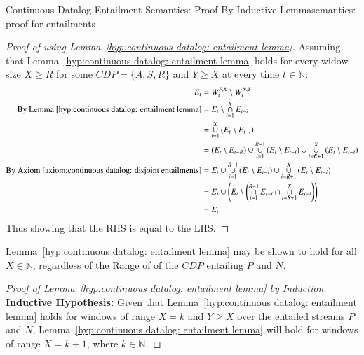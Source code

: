 \begin{nestedsection}{Continuous Datalog Entailment Semantics: Proof By Inductive Lemma}{semantics: proof for entailments}
	\begin{proof}[Proof of  using Lemma~\ref{hyp:continuous datalog: entailment lemma}]
		Assuming that Lemma~\ref{hyp:continuous datalog: entailment lemma} holds for every widow size ${X \geq R}$ for some ${CDP = \{A,S,R\}}$ and ${Y \geq X}$ at every time ${t \in \mathbb{N}}$:
		\begin{align*}
			E_t & = W^{P,X}_t \setminus W^{N,Y}_t \\
			\text{By Lemma~\ref{hyp:continuous datalog: entailment lemma}} & = E_t \setminus \mathop{\cap}^{X}_{i=1} E_{t-i} \\
			& = \mathop{\cup}^{X}_{i=1} \left( E_t \setminus E_{t-i} \right) \\
			& = \left( E_t \setminus E_{t-R} \right) \cup \mathop{\cup}^{R-1}_{i=1} \left( E_t \setminus E_{t-i} \right) \cup \mathop{\cup}^{X}_{i=R+1} \left( E_t \setminus E_{t-i} \right) \\
			\text{By Axiom~\ref{axiom:continuous datalog: disjoint entailments}} & = E_t \cup \mathop{\cup}^{R-1}_{i=1} \left( E_t \setminus E_{t-i} \right) \cup \mathop{\cup}^{X}_{i=R+1} \left( E_t \setminus E_{t-i} \right) \\
			& = E_t \cup \left( E_t \setminus \left( \mathop{\cap}^{R-1}_{i=1} E_{t-i} \cap \mathop{\cap}^{X}_{i=R+1} E_{t-i} \right) \right) \\
			& = E_t
		\end{align*}
		Thus showing that the RHS is equal to the LHS.
	\end{proof}

	Lemma~\ref{hyp:continuous datalog: entailment lemma} may be shown to hold for all ${X \in \mathbb{N}}$, regardless of the Range of of the ${CDP}$ entailing $P$ and $N$.

	\begin{proof}[Proof of Lemma~\ref{hyp:continuous datalog: entailment lemma} by Induction]
		\textbf{Inductive Hypothesis:} Given that Lemma~\ref{hyp:continuous datalog: entailment lemma} holds for windows of range ${X = k}$ and ${Y \geq X}$ over the entailed streams $P$ and $N$, Lemma~\ref{hyp:continuous datalog: entailment lemma} will hold for windows of range ${X = k + 1}$, where ${k \in \mathbb{N}}$.


\end{proof}
\end{nestedsection}
